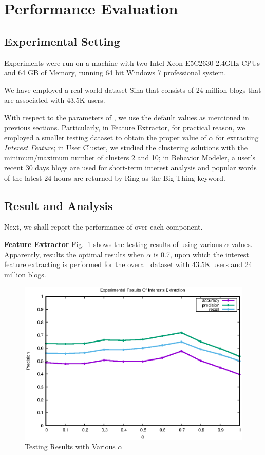 \section{Performance Evaluation}
\label{sec:perf}

\subsection{Experimental Setting}

Experiments were run on a machine with two Intel Xeon E5C2630 2.4GHz CPUs and 64 GB of Memory, running 64 bit Windows 7 professional system.

We have employed a real-world dataset Sina  that consists of 24 million blogs that are associated with 43.5K users.

With respect to the parameters of \sys{}, we use the default values as mentioned in previous sections.
Particularly, in Feature Extractor, for practical reason, we employed a smaller testing dataset to obtain the proper value of $\alpha$ for extracting \textit{Interest Feature};
in User Cluster, we studied the clustering solutions with the minimum/maximum number of clusters 2 and 10;
in Behavior Modeler, a user's recent 30 days blogs are used for short-term interest analysis and popular words of the latest 24 hours are returned by Ring  as the Big Thing keyword.

\subsection{Result and Analysis}
Next, we shall report the performance of \sys{} over each component.

\textbf{Feature Extractor}
%
Fig.\ \ref{fig:fe} shows the testing results of using various $\alpha$ values.
Apparently, \sys{} results the optimal results when $\alpha$ is 0.7, upon which the interest feature extracting is performed for the overall dataset with 43.5K users and 24 million blogs.

\begin{figure}[!htb]
\centering
\includegraphics[width=.96\linewidth]{figures/Interests}
\caption{Testing Results with Various $\alpha$ \tbc{}}
\label{fig:fe}
\end{figure}


